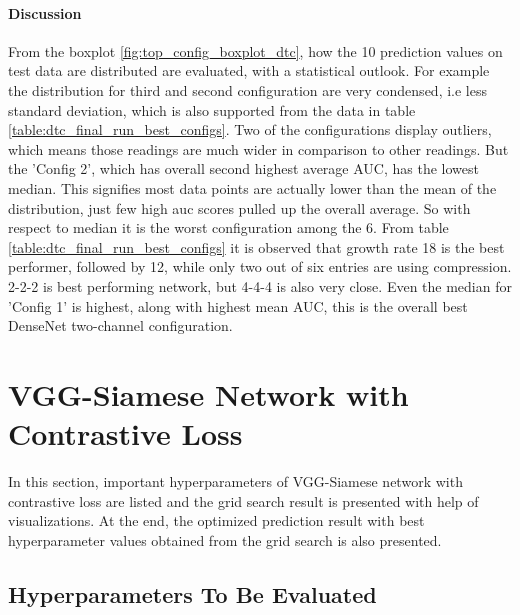 \paragraph{Discussion\\}
From the boxplot \ref{fig:top_config_boxplot_dtc}, how the 10 prediction values on test data are distributed are evaluated, with a statistical outlook. For example the distribution for third and second configuration are very condensed, i.e 
less standard deviation, which is also supported from the data in table \ref{table:dtc_final_run_best_configs}. Two of the configurations display outliers, which means those readings are much wider in comparison to other readings. But the 
'Config 2', which has overall second highest average AUC, has the lowest median. This signifies most data points are actually lower than the mean of the distribution, just few high auc scores pulled up the overall average.
So with respect to median it is the worst configuration among the 6. From table \ref{table:dtc_final_run_best_configs} it is observed that growth rate 18 is the best performer, followed by 12, while only two out of six
entries are using compression. 2-2-2 is best performing network, but 4-4-4 is also very close. Even the median for 'Config 1' is highest, along with highest mean AUC, this is the overall best DenseNet two-channel configuration.


\flushbottom
\newpage

\section{VGG-Siamese Network with Contrastive Loss}
\label{sec:contrastive_loss_results}
In this section, important hyperparameters of VGG-Siamese network with contrastive loss are listed and the grid search result is presented with help of visualizations. At the end, the optimized prediction result with best hyperparameter 
values obtained from the grid search is also presented. %

\subsection{Hyperparameters To Be Evaluated}

